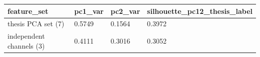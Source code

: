 \begin{tabular}{llll}
\toprule
feature\_set & pc1\_var & pc2\_var & silhouette\_pc12\_thesis\_label \\
\midrule
thesis PCA set (7) & 0.5749 & 0.1564 & 0.3972 \\
independent channels (3) & 0.4111 & 0.3016 & 0.3052 \\
\bottomrule
\end{tabular}
